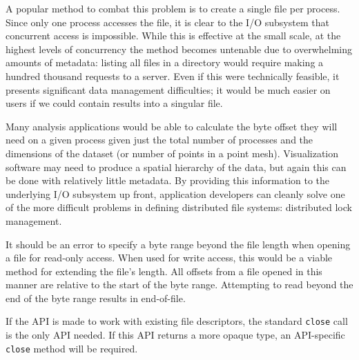 A popular method to combat this problem is to create a single file per
process.  Since only one process accesses the file, it is clear to
the I/O subsystem that concurrent access is impossible.  While this
is effective at the small scale, at the highest levels of concurrency
the method becomes untenable due to overwhelming amounts of metadata:
listing all files in a directory would require making a hundred
thousand requests to a server.  Even if this were technically feasible,
it presents significant data management difficulties; it would be much
easier on users if we could contain results into a singular file.

Many analysis applications would be able to calculate the byte offset
they will need on a given process given just the total number of
processes and the dimensions of the dataset (or number of points in
a point mesh).  Visualization software may need to produce a spatial
hierarchy of the data, but again this can be done with relatively
little metadata.  By providing this information to the underlying
I/O subsystem up front, application developers can cleanly solve one
of the more difficult problems in defining distributed file systems:
distributed lock management.

It should be an error to specify a byte range beyond the file length
when opening a file for read-only access.  When used for write access,
this would be a viable method for extending the file's length.  All
offsets from a file opened in this manner are relative to the start of
the byte range.  Attempting to read beyond the end of the byte range
results in end-of-file.

If the API is made to work with existing file descriptors, the standard
\verb!close! call is the only API needed.  If this API returns a more
opaque type, an API-specific \verb!close! method will be required.


